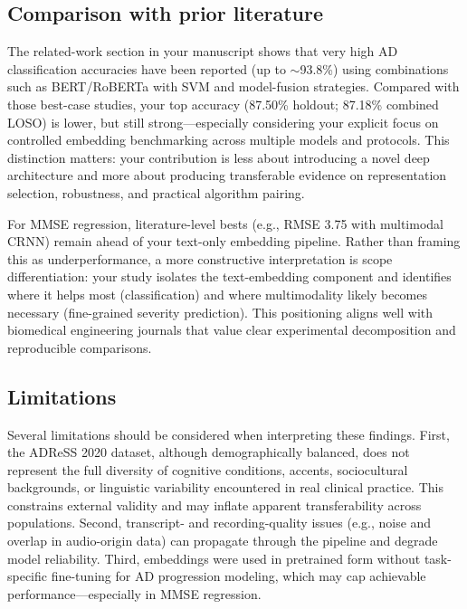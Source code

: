 \documentclass[final,5p,times]{elsarticle}
\begin{document}
\subsection{Comparison with prior literature}
\label{subsec:comparison_prior_literature}

The related-work section in your manuscript shows that very high AD classification accuracies have been reported (up to $\sim$93.8\%) using combinations such as BERT/RoBERTa with SVM and model-fusion strategies. Compared with those best-case studies, your top accuracy (87.50\% holdout; 87.18\% combined LOSO) is lower, but still strong---especially considering your explicit focus on controlled embedding benchmarking across multiple models and protocols. This distinction matters: your contribution is less about introducing a novel deep architecture and more about producing transferable evidence on representation selection, robustness, and practical algorithm pairing.

For MMSE regression, literature-level bests (e.g., RMSE 3.75 with multimodal CRNN) remain ahead of your text-only embedding pipeline. Rather than framing this as underperformance, a more constructive interpretation is scope differentiation: your study isolates the text-embedding component and identifies where it helps most (classification) and where multimodality likely becomes necessary (fine-grained severity prediction). This positioning aligns well with biomedical engineering journals that value clear experimental decomposition and reproducible comparisons.

\subsection{Limitations}
\label{subsec:limitations}

Several limitations should be considered when interpreting these findings. First, the ADReSS 2020 dataset, although demographically balanced, does not represent the full diversity of cognitive conditions, accents, sociocultural backgrounds, or linguistic variability encountered in real clinical practice. This constrains external validity and may inflate apparent transferability across populations. Second, transcript- and recording-quality issues (e.g., noise and overlap in audio-origin data) can propagate through the pipeline and degrade model reliability. Third, embeddings were used in pretrained form without task-specific fine-tuning for AD progression modeling, which may cap achievable performance---especially in MMSE regression.
\end{document}
